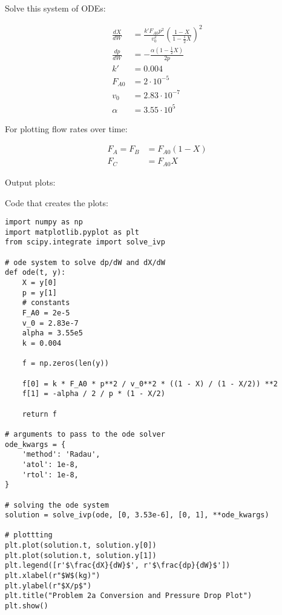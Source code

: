 \documentclass[12pt]{article}
\begin{document}
\begin{enumerate}
\begin{enumerate}
        Solve this system of ODEs:

        \begin{align*}
            \frac{dX}{dW} &= \frac{k' F_{A0} p^2}{v_0^2} \left( \frac{1 - X}{1 -\frac{1}{2}X} \right)^2 \\
            \frac{dp}{dW} &= -\frac{\alpha \left( 1 -\frac{1}{2}X \right)}{2p} \\
            k' &= 0.004 \\
            F_{A0} &= 2 \cdot 10^{-5} \\
            v_0 &= 2.83 \cdot 10^{-7} \\
            \alpha &= 3.55 \cdot 10^{5}
        \end{align*}

        For plotting flow rates over time:

        \begin{align*}
            F_A = F_B &= F_{A0} (1 - X) \\
            F_C &= F_{A0} X
        \end{align*}

        Output plots:

        

        

        \newpage
        Code that creates the plots:

\begin{verbatim}
import numpy as np
import matplotlib.pyplot as plt
from scipy.integrate import solve_ivp

# ode system to solve dp/dW and dX/dW
def ode(t, y):
    X = y[0]
    p = y[1]
    # constants
    F_A0 = 2e-5
    v_0 = 2.83e-7
    alpha = 3.55e5
    k = 0.004

    f = np.zeros(len(y))

    f[0] = k * F_A0 * p**2 / v_0**2 * ((1 - X) / (1 - X/2)) **2
    f[1] = -alpha / 2 / p * (1 - X/2)

    return f

# arguments to pass to the ode solver
ode_kwargs = {
    'method': 'Radau',
    'atol': 1e-8,
    'rtol': 1e-8,
}

# solving the ode system
solution = solve_ivp(ode, [0, 3.53e-6], [0, 1], **ode_kwargs)

# plottting
plt.plot(solution.t, solution.y[0])
plt.plot(solution.t, solution.y[1])
plt.legend([r'$\frac{dX}{dW}$', r'$\frac{dp}{dW}$'])
plt.xlabel(r"$W$(kg)")
plt.ylabel(r"$X/p$")
plt.title("Problem 2a Conversion and Pressure Drop Plot")
plt.show()


\end{verbatim}
\end{enumerate}
\end{enumerate}
\end{document}
